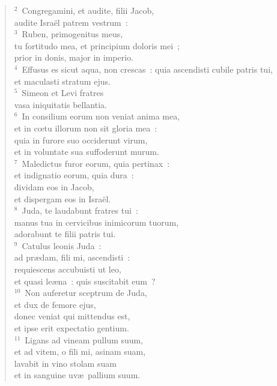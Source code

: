 \begin{flushleft}\begin{verse}\vspace{6pt}${}^{2}$~Congregamini, et audite, filii Jacob,\\ audite Isra\"el patrem vestrum~:\\
${}^{3}$~Ruben, primogenitus meus,\\ tu fortitudo mea, et principium doloris mei~;\\ prior in donis, major in imperio.\\
${}^{4}$~Effusus es sicut aqua, non crescas~: quia ascendisti cubile patris tui,\\ et maculasti stratum ejus.\\
${}^{5}$~Simeon et Levi fratres\\ vasa iniquitatis bellantia.\\
${}^{6}$~In consilium eorum non veniat anima mea,\\ et in cœtu illorum non sit gloria mea~:\\ quia in furore suo occiderunt virum,\\ et in voluntate sua suffoderunt murum.\\
${}^{7}$~Maledictus furor eorum, quia pertinax~:\\ et indignatio eorum, quia dura~:\\ dividam eos in Jacob,\\ et dispergam eos in Isra\"el.\\
${}^{8}$~Juda, te laudabunt fratres tui~:\\ manus tua in cervicibus inimicorum tuorum,\\ adorabunt te filii patris tui.\\
${}^{9}$~Catulus leonis Juda~:\\ ad pr\ae dam, fili mi, ascendisti~:\\ requiescens accubuisti ut leo,\\ et quasi le\ae na~: quis suscitabit eum~?\\
${}^{10}$~Non auferetur sceptrum de Juda,\\ et dux de femore ejus,\\ donec veniat qui mittendus est,\\ et ipse erit expectatio gentium.\\
${}^{11}$~Ligans ad vineam pullum suum,\\ et ad vitem, o fili mi, asinam suam,\\ lavabit in vino stolam suam\\ et in sanguine uv\ae\ pallium suum.\\

\end{verse}
\end{flushleft}

